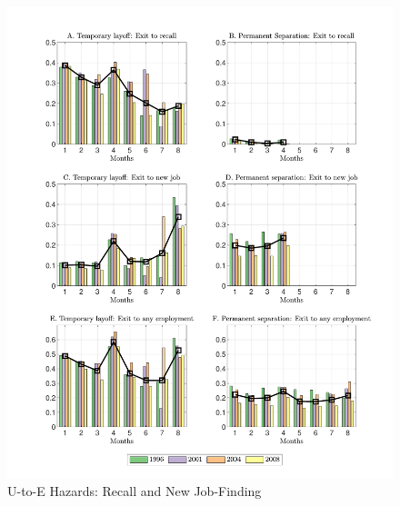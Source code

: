 \documentclass[12pt]{article}
\begin{document}
  \begin{figure}
    \caption{U-to-E Hazards: Recall and New Job-Finding\label{fig:UE}}
  \centerline{\includegraphics[width=1.00\linewidth]{./../figures/all}}
  \end{figure}
\end{document}
